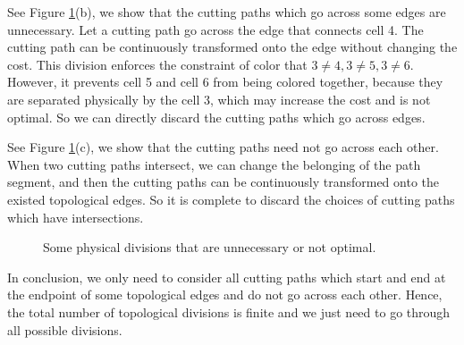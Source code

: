 \documentclass[journal]{IEEEtran}
\begin{document}
See Figure \ref{figproof}(b), we show that the cutting paths which go across some edges are unnecessary. Let a cutting path go across the edge that connects cell 4. 
The cutting path can be continuously transformed onto the edge without changing the cost. 
This division enforces the constraint of color that $3\neq 4, 3\neq 5, 3\neq 6$. However, it prevents cell 5 and cell 6 from being colored together, because they are separated physically by the cell 3, which may increase the cost and is not optimal. So we can directly discard the cutting paths which go across edges. 

See Figure \ref{figproof}(c), we show that the cutting paths need not go across each other. When two cutting paths intersect, we can change the belonging of the path segment, and then the cutting paths can be continuously transformed onto the existed topological edges. So it is complete to discard the choices of cutting paths which have intersections. 


\begin{figure}[t]
\centering
{}
\caption{Some physical divisions that are unnecessary or not optimal. }\label{figproof}
\end{figure}

In conclusion, we only need to consider all cutting paths which start and end at the endpoint of some topological edges and do not go across each other. Hence, the total number of topological divisions is finite and we just need to go through all possible divisions. 
\end{document}
